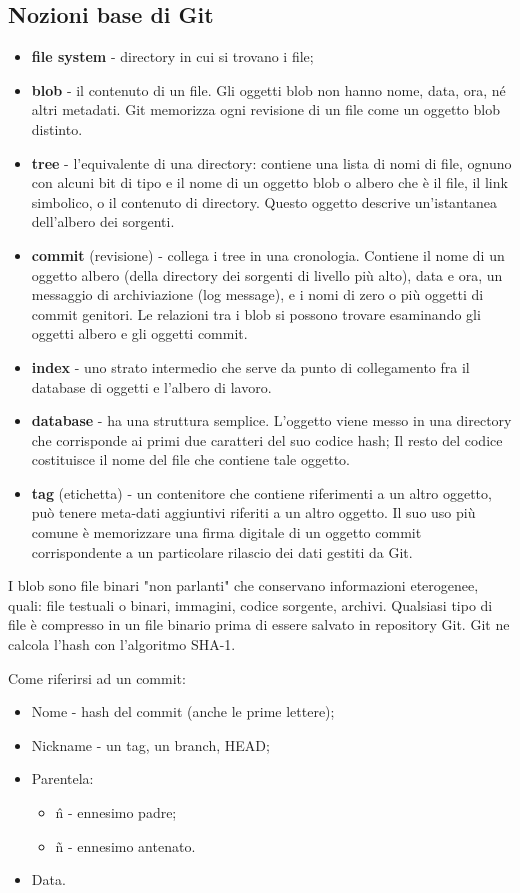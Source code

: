 \documentclass[a4paper,12pt,titlepage,oneside]{book}
\begin{document}
\subsection{Nozioni base di Git}
\begin{itemize}
    \item \textbf{file system} - directory in cui si trovano i file;
    \item \textbf{blob} - il contenuto di un file. Gli oggetti blob non hanno nome, data, ora, né altri metadati. 
        Git memorizza ogni revisione di un file come un oggetto blob distinto.
    \item \textbf{tree} - l'equivalente di una directory: contiene una lista di nomi di file, ognuno con alcuni bit di tipo e il nome di un oggetto blob o 
        albero che è il file, il link simbolico, o il contenuto di directory. Questo oggetto descrive un'istantanea dell'albero dei sorgenti.
    \item \textbf{commit} (revisione) - collega i tree in una cronologia. Contiene il nome di un oggetto albero (della directory dei sorgenti di livello più alto), 
        data e ora, un messaggio di archiviazione (log message), e i nomi di zero o più oggetti di commit genitori. Le relazioni tra i blob si possono trovare 
        esaminando gli oggetti albero e gli oggetti commit.
    \item \textbf{index} - uno strato intermedio che serve da punto di collegamento fra il database di oggetti e l'albero di lavoro.
    \item \textbf{database} - ha una struttura semplice. L'oggetto viene messo in una directory che corrisponde ai primi due caratteri del suo codice hash; 
        Il resto del codice costituisce il nome del file che contiene tale oggetto. 
    \item \textbf{tag} (etichetta) - un contenitore che contiene riferimenti a un altro oggetto, può tenere meta-dati aggiuntivi riferiti a un altro oggetto. 
        Il suo uso più comune è memorizzare una firma digitale di un oggetto commit corrispondente a un particolare rilascio dei dati gestiti da Git.
\end{itemize} 
I blob sono file binari "non parlanti" che conservano informazioni eterogenee, quali: file testuali o binari, immagini, codice sorgente, archivi. 
Qualsiasi tipo di file è compresso in un file binario prima di essere salvato in repository Git. Git ne calcola l'hash con l'algoritmo SHA-1.

Come riferirsi ad un commit:
\begin{itemize}
    \item Nome - hash del commit (anche le prime lettere);
    \item Nickname - un tag, un branch, HEAD;
    \item Parentela:
    \begin{itemize}
        \item \^n - ennesimo padre;
        \item \~n - ennesimo antenato.
    \end{itemize} 
    \item Data.
\end{itemize} 
\end{document}
